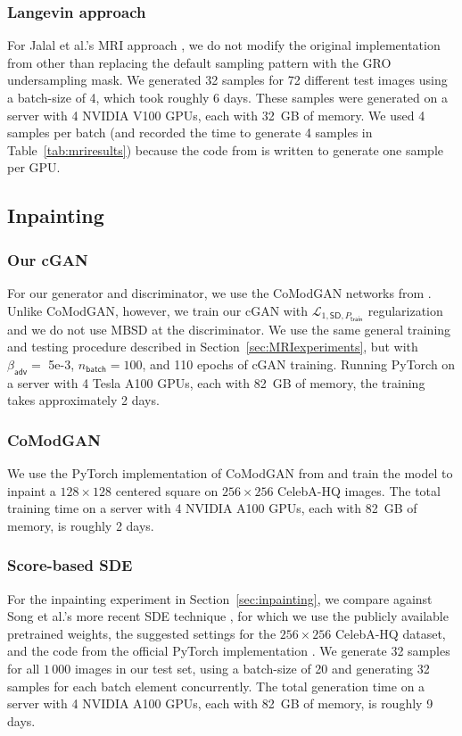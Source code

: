 \documentclass{article}
\theoremstyle{plain}
\theoremstyle{definition}
\theoremstyle{remark}
\newcommand{\mc}[1]{\ensuremath{\mathcal{#1}}}
\newcommand{\tabref}[1]{Table~\ref{tab:#1}}
\newcommand{\secref}[1]{Section~\ref{sec:#1}}
\newcommand{\batch}{_{\mathsf{batch}}}
\newcommand{\train}{_{\mathsf{train}}}
\newcommand{\LonestdPt}{\mc{L}_{1,\mathsf{SD},P\train}}
\newcommand{\betaadv}{\beta_{\mathsf{adv}}}
\begin{document}
\subsubsection{Langevin approach} 
For Jalal et al.'s MRI approach \cite{Jalal:NIPS:21}, we do not modify the original implementation from \cite{Jalal:github:21} other than replacing the default sampling pattern with the GRO undersampling mask. 
We generated 32 samples for 72 different test images using a batch-size of 4, which took roughly 6 days. 
These samples were generated on a server with 4 NVIDIA V100 GPUs, each with 32~GB of memory.
We used 4 samples per batch (and recorded the time to generate 4 samples in \tabref{mriresults}) because the code from \cite{Jalal:github:21} is written to generate one sample per GPU.

\subsection{Inpainting} \label{app:inpainting}

\subsubsection{Our cGAN} 
For our generator and discriminator, we use the CoModGAN networks from \cite{Zhao:ICLR:21}.
Unlike CoModGAN, however, we train our cGAN with $\LonestdPt$ regularization and we do not use MBSD at the discriminator.
We use the same general training and testing procedure described in \secref{MRIexperiments}, but with $\betaadv=$ 5e-3, $n\batch=100$, and 110 epochs of cGAN training.
Running PyTorch on a server with 4 Tesla A100 GPUs, each with 82~GB of memory, the training takes approximately 2 days.

\subsubsection{CoModGAN} 
We use the PyTorch implementation of CoModGAN from \cite{Zeng:github:22} and train the model
to inpaint a $128\times128$ centered square on $256\times256$ CelebA-HQ images. 
The total training time on a server with 4 NVIDIA A100 GPUs, each with 82~GB of memory, is roughly 2 days.

\subsubsection{Score-based SDE} 
For the inpainting experiment in \secref{inpainting}, we compare against Song et al.'s more recent SDE technique \cite{Song:ICLR:21}, for which we use the publicly available pretrained weights, the suggested settings for the $256\times256$ CelebA-HQ dataset, and the code from the official PyTorch implementation \cite{Song:github:21b}.
We generate 32 samples for all $1\,000$ images in our test set, using a batch-size of 20 and generating 32 samples for each batch element concurrently.
The total generation time on a server with 4 NVIDIA A100 GPUs, each with 82~GB of memory, is roughly 9 days.
\end{document}
